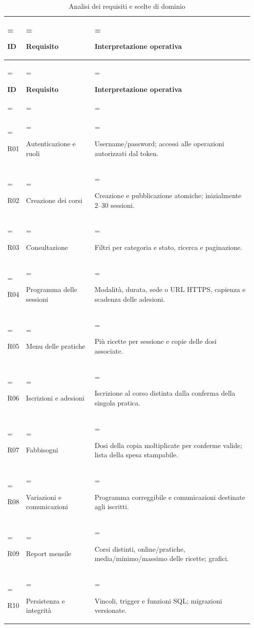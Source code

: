 \documentclass[11pt,a4paper]{article}
\begin{document}
{\small \renewcommand{\arraystretch}{1.2}

\begin{xltabular}{\linewidth}{>{\hsize\linewidth=\hsize\raggedright\arraybackslash}X>{\hsize\linewidth=\hsize\raggedright\arraybackslash}X>{\hsize\linewidth=\hsize\raggedright\arraybackslash}X}
\caption{Analisi dei requisiti e scelte di dominio}\label{tab:dictionary-1}\\
\toprule

\textbf{ID} & \textbf{Requisito} & \textbf{Interpretazione operativa}\\\midrule\endfirsthead\toprule\textbf{ID} & \textbf{Requisito} & \textbf{Interpretazione operativa}\\\midrule\endhead
\midrule{}\\\endfoot\bottomrule\endlastfoot


{\ttfamily\small R01} & Autenticazione e ruoli & Username/password; accessi alle operazioni autorizzati dal token.\\\addlinespace[3pt]

{\ttfamily\small R02} & Creazione dei corsi & Creazione e pubblicazione atomiche; inizialmente 2--30 sessioni.\\\addlinespace[3pt]

{\ttfamily\small R03} & Consultazione & Filtri per categoria e stato, ricerca e paginazione.\\\addlinespace[3pt]

{\ttfamily\small R04} & Programma delle sessioni & Modalità, durata, sede o URL HTTPS, capienza e scadenza delle adesioni.\\\addlinespace[3pt]

{\ttfamily\small R05} & Menu delle pratiche & Più ricette per sessione e copie delle dosi associate.\\\addlinespace[3pt]

{\ttfamily\small R06} & Iscrizioni e adesioni & Iscrizione al corso distinta dalla conferma della singola pratica.\\\addlinespace[3pt]

{\ttfamily\small R07} & Fabbisogni & Dosi della copia moltiplicate per conferme valide; lista della spesa stampabile.\\\addlinespace[3pt]

{\ttfamily\small R08} & Variazioni e comunicazioni & Programma correggibile e comunicazioni destinate agli iscritti.\\\addlinespace[3pt]

{\ttfamily\small R09} & Report mensile & Corsi distinti, online/pratiche, media/minimo/massimo delle ricette; grafici.\\\addlinespace[3pt]

{\ttfamily\small R10} & Persistenza e integrità & Vincoli, trigger e funzioni SQL; migrazioni versionate.\\*



\end{xltabular}}
\end{document}

